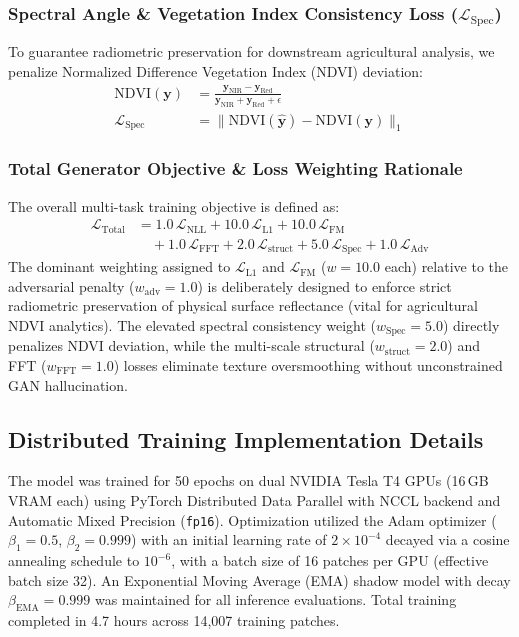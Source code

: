 \subsubsection{Spectral Angle \& Vegetation Index Consistency Loss ($\mathcal{L}_{\text{Spec}}$)}
To guarantee radiometric preservation for downstream agricultural analysis, we penalize Normalized Difference Vegetation Index (NDVI) deviation:
\begin{align}
    \text{NDVI}(\mathbf{y}) &= \frac{\mathbf{y}_{\text{NIR}} - \mathbf{y}_{\text{Red}}}{\mathbf{y}_{\text{NIR}} + \mathbf{y}_{\text{Red}} + \epsilon} \\
    \mathcal{L}_{\text{Spec}} &= \|\text{NDVI}(\hat{\mathbf{y}}) - \text{NDVI}(\mathbf{y})\|_1
\end{align}

\subsubsection{Total Generator Objective \& Loss Weighting Rationale}
The overall multi-task training objective is defined as:
\begin{align}
    \mathcal{L}_{\text{Total}} &= 1.0\,\mathcal{L}_{\text{NLL}} + 10.0\,\mathcal{L}_{\text{L1}} + 10.0\,\mathcal{L}_{\text{FM}} \nonumber \\
    &\quad + 1.0\,\mathcal{L}_{\text{FFT}} + 2.0\,\mathcal{L}_{\text{struct}} + 5.0\,\mathcal{L}_{\text{Spec}} + 1.0\,\mathcal{L}_{\text{Adv}}
\end{align}
The dominant weighting assigned to $\mathcal{L}_{\text{L1}}$ and $\mathcal{L}_{\text{FM}}$ ($w = 10.0$ each) relative to the adversarial penalty ($w_{\text{adv}} = 1.0$) is deliberately designed to enforce strict radiometric preservation of physical surface reflectance (vital for agricultural NDVI analytics). The elevated spectral consistency weight ($w_{\text{Spec}} = 5.0$) directly penalizes NDVI deviation, while the multi-scale structural ($w_{\text{struct}} = 2.0$) and FFT ($w_{\text{FFT}} = 1.0$) losses eliminate texture oversmoothing without unconstrained GAN hallucination.

\subsection{Distributed Training Implementation Details}
The model was trained for 50 epochs on dual NVIDIA Tesla T4 GPUs (16\,GB VRAM each) using PyTorch Distributed Data Parallel with NCCL backend and Automatic Mixed Precision (\texttt{fp16}). Optimization utilized the Adam optimizer ($\beta_1 = 0.5$, $\beta_2 = 0.999$) with an initial learning rate of $2 \times 10^{-4}$ decayed via a cosine annealing schedule to $10^{-6}$, with a batch size of 16 patches per GPU (effective batch size 32). An Exponential Moving Average (EMA) shadow model with decay $\beta_{\text{EMA}} = 0.999$ was maintained for all inference evaluations. Total training completed in 4.7 hours across 14,007 training patches.
